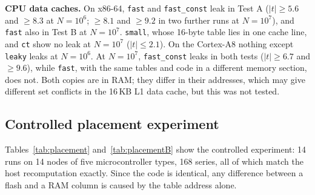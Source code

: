 \documentclass[11pt, a4paper, twoside, reqno]{article}
\newcommand{\tsm}{\texttt{small}}
\newcommand{\tfa}{\texttt{fast}}
\newcommand{\tfc}{\texttt{fast\_const}}
\newcommand{\tct}{\texttt{ct}}
\newcommand{\tlk}{\texttt{leaky}}
\begin{document}
\textbf{CPU data caches.} On x86-64, \tfa{} and \tfc{} leak in Test A ($|t|\geq5.6$ and $\geq8.3$ at $N=10^6$; $\geq8.1$ and $\geq9.2$ in two further runs at $N=10^7$), and \tfa{} also in Test B at $N=10^7$. \tsm{}, whose 16-byte table lies in one cache line, and \tct{} show no leak at $N=10^7$ ($|t|\leq2.1$). On the Cortex-A8 nothing except \tlk{} leaks at $N=10^6$. At $N=10^7$, \tfc{} leaks in both tests ($|t|\geq6.7$ and $\geq9.6$), while \tfa{}, with the same tables and code in a different memory section, does not. Both copies are in RAM; they differ in their addresses, which may give different set conflicts in the 16\,KB L1 data cache, but this was not tested.

\subsection{Controlled placement experiment}

Tables~\ref{tab:placement} and~\ref{tab:placementB} show the controlled experiment: 14 runs on 14 nodes of five microcontroller types, 168 series, all of which match the host recomputation exactly. Since the code is identical, any difference between a flash and a RAM column is caused by the table address alone.

\begin{table}[!htbp]
\centering
\caption{Controlled placement experiment, Test A (fixed vs random plaintext): identical code, tables read from flash (fl) or RAM. S: 16-byte S-box of \tsm{} (aligned to 64 bytes); T: tables of \tfa{} plus the S-box; lk1, lk32: positive controls with 1 and 32 dummy iterations. Cells as in Table~\ref{tab:results}; in brackets, for repeated leaks, the mean difference random $-$ fixed in cycles (average of the two runs). $N=10^6$ per run, two nodes per row.}
\label{tab:placement}
\footnotesize
\resizebox{\textwidth}{!}{}
\end{table}

\begin{table}[!htbp]
\centering
\caption{Controlled placement experiment, Test B (fixed vs random key, key schedule timed); columns as in Table~\ref{tab:placement}.}
\label{tab:placementB}
\footnotesize
\resizebox{\textwidth}{!}{}
\end{table}
\end{document}
